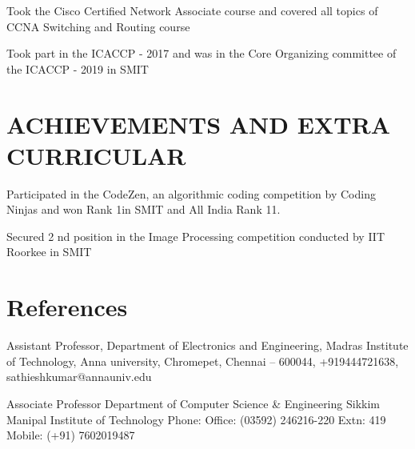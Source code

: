 \documentclass[]{imman_resume}
\begin{document}
\begin{minipage}[t]{1\textwidth}
Took the Cisco Certified Network Associate course and covered all topics of CCNA Switching and Routing course
\sectionsep


Took part in the ICACCP - 2017 and was in the Core Organizing committee of the ICACCP - 2019 in SMIT
\sectionsep

\sectionsep

\section{ACHIEVEMENTS AND EXTRA CURRICULAR}

Participated in the CodeZen, an algorithmic coding competition by Coding Ninjas and won Rank 1in SMIT and All India
Rank 11.
\sectionsep


Secured 2 nd position in the Image Processing competition conducted by IIT Roorkee in SMIT 
\sectionsep

\section{References}

Assistant Professor, Department of Electronics and Engineering, Madras Institute of Technology, Anna university, Chromepet, Chennai – 600044, +919444721638, sathieshkumar@annauniv.edu
\sectionsep


Associate Professor
Department of Computer Science & Engineering
Sikkim Manipal Institute of Technology
Phone: Office: (03592) 246216-220 Extn: 419
           Mobile: (+91) 7602019487
\sectionsep
\end{minipage}
\end{document}
